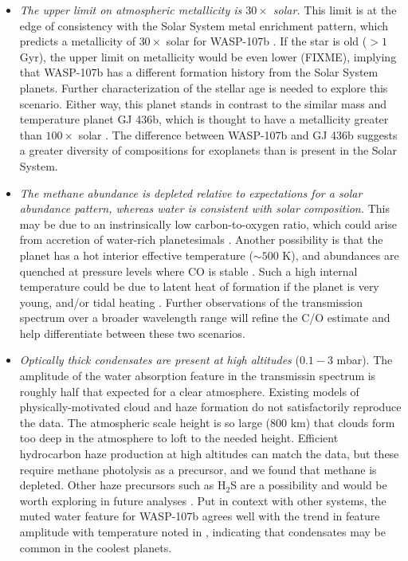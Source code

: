\documentclass[twocolumn]{aastex61}
\begin{document}
\begin{itemize}
\item{\emph{The upper limit on atmospheric metallicity is $30\times$ solar.} This limit is at the edge of consistency with the Solar System metal enrichment pattern, which predicts a metallicity of $30\times$ solar for WASP-107b \citep{kreidberg14b}.  If the star is old ($>1$ Gyr), the upper limit on metallicity would be even lower (FIXME), implying that WASP-107b has a different formation history from the Solar System planets. Further characterization of the stellar age is needed to explore this scenario.  Either way, this planet stands in contrast to the similar mass and temperature planet GJ 436b, which is thought to have a metallicity greater than $100\times$ solar \citep{moses13, morley17}. The difference between WASP-107b and GJ 436b suggests a greater diversity of compositions for exoplanets than is present in the Solar System.}
\item{\emph{The methane abundance is depleted relative to expectations for a solar abundance pattern, whereas water is consistent with solar composition.} This may be due to an instrinsically low carbon-to-oxygen ratio, which could arise from accretion of water-rich planetesimals \citep{mordasini16, espinoza17}.  Another possibility is that the planet has a hot interior effective temperature ($\sim500$ K), and abundances are quenched at pressure levels where CO is stable \citep[as observed in some directly imaged planets;][]{skemer14, zahnle14}. Such a high internal temperature could be due to latent heat of formation if the planet is very young, and/or tidal heating \citep{fortney08, morley17}. Further observations of the transmission spectrum over a broader wavelength range will refine the C/O estimate and help differentiate between these two scenarios.} 
\item{\emph{Optically thick condensates are present at high altitudes} ($0.1 - 3$ mbar). The amplitude of the water absorption feature in the transmissin spectrum is roughly half that expected for a clear atmosphere. Existing models of physically-motivated cloud and haze formation do not satisfactorily reproduce the data. The atmospheric scale height is so large (800 km) that clouds form too deep in the atmosphere to loft to the needed height. Efficient hydrocarbon haze production at high altitudes can match the data, but these require methane photolysis as a precursor, and we found that methane is depleted.  Other haze precursors such as H$_2$S are a possibility and would be worth exploring in future analyses \citep{zahnle09, gao17}. Put in context with other systems, the muted water feature for WASP-107b agrees well with the trend in feature amplitude with temperature noted in \cite{crossfield17}, indicating that condensates may be common in the coolest planets.}
\end{itemize}
\end{document}
